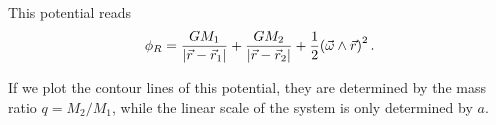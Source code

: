 \documentclass[main.tex]{subfiles}
\begin{document}
This potential reads 
%
\begin{align}
\phi _R = \frac{GM_1}{\abs{\vec{r} - \vec{r}_1} } + \frac{GM_2}{\abs{\vec{r} - \vec{r}_2} } + \frac{1}{2} \qty(\vec{\omega} \wedge \vec{r})^2
\,.
\end{align}


If we plot the contour lines of this potential, they are determined by the mass ratio \(q = M_2 / M_1 \), while the linear scale of the system is only determined by \(a\).
\end{document}
